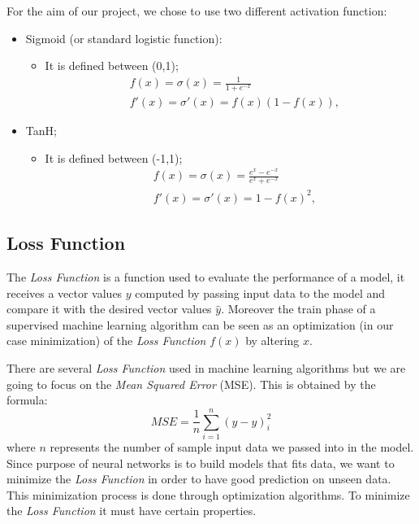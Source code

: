 For the aim of our project, we chose to use two different activation function:
\begin{itemize}
	\item Sigmoid (or standard logistic function):
	\begin{itemize}
		\item It is defined between (0,1); 		
			\begin{align*}
			&f(x) = \sigma(x) = \frac{1}{1 + e^{-x}} \\
			&f'(x) = \sigma'(x) = f(x)(1 - f(x)),
			\end{align*} 
	\end{itemize}
	\item TanH;
	\begin{itemize}
		\item It is defined between (-1,1); 		
		\begin{align*}
		&f(x) = \sigma(x) = \frac{e^{x}-e^{-x}}{e^{x} + e^{-x}} \\
		&f'(x) = \sigma'(x) = 1 - f(x)^{2},
		\end{align*} 
	\end{itemize}
\end{itemize}
\subsection{Loss Function}
The \textit{Loss Function} is a function used to evaluate the performance of a model, it receives a vector values $y$ computed by passing input data to the model and compare it with the desired vector values $\widehat{y}$.
Moreover the train phase of a supervised machine learning algorithm can be seen as an optimization (in our case minimization) of the \textit{Loss Function} $f(x)$ by altering $x$.   

There are several \textit{Loss Function} used in machine learning algorithms but we are going to focus on the \textit{Mean Squared Error} (MSE). This is obtained by the formula: 	
\begin{equation}
MSE = \frac{1}{n} \sum_{i=1}^n (\widehat{y}-y)_{i}^2
\end{equation}
where $n$ represents the number of sample input data we passed into in the model. Since purpose of neural networks is to build models that fits data, we want to minimize the \textit{Loss Function} in order to have good prediction on unseen data. This minimization process is done through optimization algorithms. To minimize the \textit{Loss Function} it must have certain properties.	

